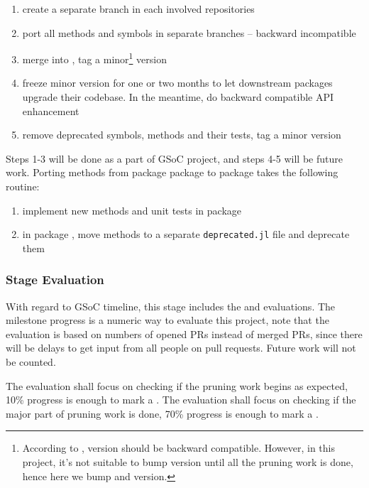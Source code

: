 \newcommand{\packageA}{package \sname{A}\xspace}
\newcommand{\packageB}{package \sname{B}\xspace}
\begin{enumerate}
    \item create a separate branch  in each involved repositories
    \item port all methods and symbols in separate branches -- backward incompatible
    \item merge into , tag a minor\footnote{According to \semanticversion{},  version should be backward compatible. However, in this project, it's not suitable to bump  version until all the pruning work is done, hence here we bump  and  version.} version
    \item freeze minor version for one or two months to let downstream packages upgrade their codebase. In the meantime, do backward compatible API enhancement
    \item remove deprecated symbols, methods and their tests, tag a minor version
\end{enumerate}
Steps 1-3 will be done as a part of GSoC project, and steps 4-5 will be future work. Porting methods from package \packageA to \packageB takes the following routine:
\begin{enumerate}
    \item implement new methods and unit tests in \packageB
    \item in \packageA, move methods to a separate \texttt{deprecated.jl} file and deprecate them
\end{enumerate}

\subsubsection*{Stage Evaluation}

With regard to GSoC timeline, this stage includes the  and  evaluations. The milestone progress is a numeric way to evaluate this project, note that the evaluation is based on numbers of opened PRs instead of merged PRs, since there will be delays to get input from all people on pull requests. Future work will not be counted.\par

The  evaluation shall focus on checking if the pruning work begins as expected, 10\% progress is enough to mark a . The  evaluation shall focus on checking if the major part of pruning work is done, 70\% progress is enough to mark a .
